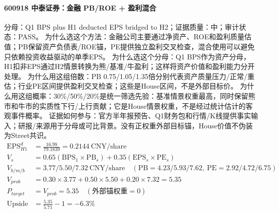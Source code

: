 \paragraph{600918 中泰证券：金融 PB/ROE + 盈利混合}
分母：Q1 BPS plus H1 deducted EPS bridged to H2；证据质量：中；审计状态：PASS。
为什么选这个方法：金融公司主要通过净资产、ROE和盈利质量估值；PB保留资产负债表/ROE锚，PE提供独立盈利交叉检查，混合使用可以避免只依赖投资收益驱动的单季EPS。
为什么选这个分母：Q1 BPS作为资产分母，H1扣非EPS通过H2情景转换为熊/基准/牛盈利；这样将资产价值和盈利能力分开处理。
为什么用这组倍数：PB 0.75/1.05/1.35倍分别代表资产质量压力/正常/重估；行业PE区间提供盈利交叉检查；这些是House区间，不是外部目标价。
为什么用这组概率：30\%/50\%/20\%是统一筛选先验：基准情景权重最高，同时保留熊市和牛市的实质性下行/上行贡献；它是House情景权重，不是经过统计估计的客观事件概率。
证据如何参与：官方半年报预告、Q1财务包和行情/K线提供事实输入；研报/来源用于分母或可比背景。没有正权重外部目标锚，House价值不伪装为Street共识。
\begin{align*}
\mathrm{EPS}_{H1}^d &= \frac{16.98}{79.1839} = 0.2144\ \mathrm{CNY/share}\\
V_s &= 0.65\left(\mathrm{BPS}_1\times \mathrm{PB}_s\right)+0.35\left(\mathrm{EPS}_s\times \mathrm{PE}_s\right)\\
V_{b/m/b} &= 3.77/5.50/7.32\ \mathrm{CNY/share}\quad(\mathrm{PB}=4.23/5.93/7.62,\ \mathrm{PE}=2.92/4.72/6.75)\\
V_{prob} &= 0.30\times 3.77+0.50\times 5.50+0.20\times 7.32=5.35\\
P_{target} &= V_{prob}=5.35\quad(\text{外部锚权重}=0)\\
\mathrm{Upside} &= \frac{5.35}{5.71}-1=-6.3\%\\
\end{align*}

